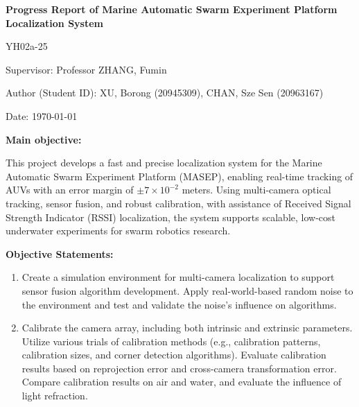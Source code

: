 \documentclass[11pt]{article}
\newcommand{\cn}[1]{\begin{CJK}{UTF8}{gbsn}#1\end{CJK}}
\newcommand{\yh}[1]{\noindent{\color{blue}\textbf{yh: }{\cn{#1}}}}
\begin{document}
\pagestyle{fancy}
\fancyhf{} 
\fancyfoot[R]{\thepage}

\begin{titlepage}
    \centering
    \vspace*{1cm}
    {\Huge\bfseries Progress Report of Marine Automatic Swarm Experiment Platform Localization System \par}
    \vspace{1.5cm}
    {\Large YH02a-25 \par}
    \vspace{0.5cm}
    {\large Supervisor: Professor ZHANG, Fumin \par}
    {\large Author (Student ID): XU, Borong (20945309), CHAN, Sze Sen (20963167) \par}
    \vspace{0.5cm}
    {\large Date: \today \par}
    \vspace{0.5cm}
    {\large\bfseries Main objective: \par}
    \begin{flushleft}
        This project develops a fast and precise localization system for the Marine Automatic Swarm Experiment Platform (MASEP), enabling real-time tracking of AUVs with an error margin of $\pm 7\times 10^{-2}$ meters. Using multi-camera optical tracking, sensor fusion, and robust calibration, with assistance of Received Signal Strength Indicator (RSSI) localization, the system supports scalable, low-cost underwater experiments for swarm robotics research.
    \vspace{0.5cm}
    \end{flushleft}
    {\large\bfseries Objective Statements: \par}
    \begin{enumerate}
        \item Create a simulation environment for multi-camera localization to support sensor fusion algorithm development. Apply real-world-based random noise to the environment and test and validate the noise's influence on algorithms.
        \item Calibrate the camera array, including both intrinsic and extrinsic parameters. Utilize various trials of calibration methods (e.g., calibration patterns, calibration sizes, and corner detection algorithms). Evaluate calibration results based on reprojection error and cross-camera transformation error. Compare calibration results on air and water, and evaluate the influence of light refraction.

\end{enumerate}
\end{titlepage}
\end{document}
